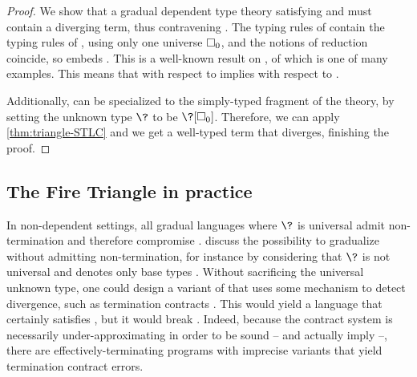 \begin{proof}
  We show that a gradual dependent type theory satisfying  and 
  must contain a diverging term, thus contravening .
  The typing rules of  contain the typing rules of ,
  using only one universe $\uni[0]$,
  and the notions of reduction coincide, so  embeds
  . This is a well-known result on  , of which  is one of many examples.
  This means that  with respect to  implies 
  with respect to .

  Additionally,  can be specialized to the simply-typed fragment of the theory,
  by setting the unknown type $\?$ to be $\?[\uni[0]]$.
  Therefore, we can apply \cref{thm:triangle-STLC}
  and we get a well-typed term that diverges, finishing the proof.
\end{proof}

\subsection{The Fire Triangle in practice}

In non-dependent settings, all gradual languages where $\?$ is universal
admit non-termination and therefore compromise .
 discuss the possibility to gradualize 
without admitting non-termination, for instance by considering that $\?$ is not universal
and denotes only base types%
.
Without sacrificing the universal unknown type, one could design a variant of 
that uses some mechanism to detect divergence, such as termination contracts
. This would yield a language that certainly satisfies
, but it would break . Indeed, because the contract system is
necessarily under-approximating in order to be sound – and actually imply  –,
there are effectively-terminating programs with imprecise variants that yield termination
contract errors.

